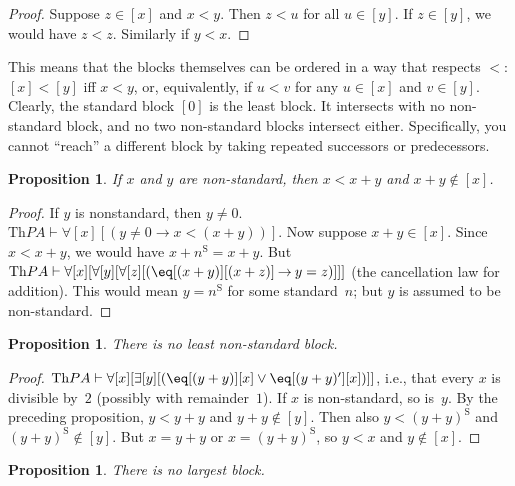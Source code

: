 \documentclass[10pt,a4paper]{article}
\theoremstyle{plain}
\newtheorem{prop}[thm]{Proposition}
\theoremstyle{definition}
\theoremstyle{remark}
\newenvironment{explain}{}{}
\providecommand{\lif}{\mathbin{\rightarrow}}
\providecommand{\lforall}{\mathord{\forall}}
\providecommand{\lexists}{\mathord{\exists}}
\providecommand{\Proves}{\mathrel{\vdash}}
\providecommand{\Obj}{}
\providecommand{\Th}{\ensuremath{\mathrm{Th}}}
\providecommand{\nszero}{\mathrm{0}}
\providecommand{\nssucc}{\mathrm{S}}
\providecommand{\nsplus}{\mathbin{+}}
\providecommand{\nsless}{<}
\begin{document}
\begin{proof}
Suppose $z \in [x]$ and $x \nsless y$. Then $z \nsless u$ for all $u
\in [y]$. If $z \in [y]$, we would have $z \nsless z$. Similarly if $y
\nsless x$.
\end{proof}

\begin{explain}
This means that the blocks themselves can be ordered in a way that
respects $\nsless$: $[x] \nsless [y]$ iff $x \nsless y$, or,
equivalently, if $u \nsless v$ for any $u \in [x]$ and $v \in [y]$.
Clearly, the standard block $[0]$ is the least block. It intersects
with no non-standard block, and no two non-standard blocks intersect
either. Specifically, you cannot ``reach'' a different block by taking
repeated successors or predecessors.
\end{explain}

\begin{prop}
If $x$ and $y$ are non-standard, then $x \nsless x \nsplus y$ and $x
\nsplus y \notin [x]$.
\end{prop}

\begin{proof}
If $y$ is nonstandard, then $y \neq \nszero$. $\Th{PA} \Proves
\lforall[x][(y \neq \Obj{0} \lif x < (x+y))]$.  Now suppose $x
\nsplus y \in [x]$. Since $x \nsless x \nsplus y$, we would have $x
\nsplus n^\nssucc = x \nsplus y$. But $\Th{PA} \Proves
\lforall[x][\lforall[y][\lforall[z][(\eq[(x+y)][(x+z)] \lif y = z)]]]$
(the cancellation law for addition). This would mean $y = n^\nssucc$
for some standard~$n$; but $y$ is assumed to be non-standard.
\end{proof}

\begin{prop}
There is no least non-standard block.
\end{prop}

\begin{proof}
$\Th{PA} \Proves \lforall[x][\lexists[y][(\eq[(y+y)][x] \lor
      \eq[(y+y)'][x])]]$, i.e., that every $x$ is divisible by~$2$
  (possibly with remainder~$1$). If $x$ is non-standard, so is~$y$. By
  the preceding proposition, $y \nsless y \nsplus y$ and $y \nsplus y
  \notin [y]$. Then also $y \nsless (y \nsplus y)^\nssucc$ and $(y
  \nsplus y)^\nssucc \notin [y]$. But $x = y \nsplus y$ or $x = (y
  \nsplus y)^\nssucc$, so $y \nsless x$ and $y \notin [x]$.
\end{proof}

\begin{prop}
There is no largest block.
\end{prop}
\end{document}
